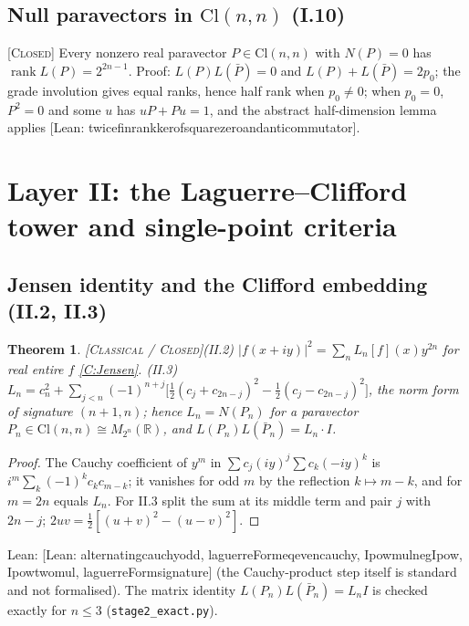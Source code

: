 \documentclass[11pt]{amsart}
\theoremstyle{plain}
\newtheorem{theorem}{Theorem}[section]
\theoremstyle{definition}
\newcommand{\R}{\mathbb{R}}
\newcommand{\Cl}{\mathrm{Cl}}
\newcommand{\status}[1]{\textsc{[#1]}}
\newcommand{\leanus}{\textunderscore\allowbreak}
\newcommand{\lean}[1]{{\ttfamily\let\_\leanus #1}}
\begin{document}
\subsection{Null paravectors in $\Cl(n,n)$ (I.10)}
\status{Closed} Every nonzero real paravector $P\in\Cl(n,n)$ with $N(P)=0$ has
$\operatorname{rank}L(P)=2^{2n-1}$. Proof: $L(P)L(\bar P)=0$ and
$L(P)+L(\bar P)=2p_0$; the grade involution gives equal ranks, hence half rank
when $p_0\ne0$; when $p_0=0$, $P^2=0$ and some $u$ has $uP+Pu=1$, and the
abstract half-dimension lemma applies
\lean{[Lean: twice\_finrank\_ker\_of\_square\_zero\_and\_anticommutator]}.

\section{Layer II: the Laguerre--Clifford tower and single-point criteria}

\subsection{Jensen identity and the Clifford embedding (II.2, II.3)}
\begin{theorem}\status{Classical / Closed}\label{thm:jensen}
(II.2) $|f(x+iy)|^2=\sum_nL_n[f](x)y^{2n}$ for real entire $f$ \ref{C:Jensen}.
(II.3) $L_n=c_n^2+\sum_{j<n}(-1)^{n+j}\big[\tfrac12(c_j+c_{2n-j})^2-\tfrac12(c_j-c_{2n-j})^2\big]$,
the norm form of signature $(n+1,n)$; hence $L_n=N(P_n)$ for a paravector
$P_n\in\Cl(n,n)\cong M_{2^n}(\R)$, and $L(P_n)L(\bar P_n)=L_n\cdot I$.
\end{theorem}
\begin{proof}
The Cauchy coefficient of $y^m$ in $\sum c_j(iy)^j\sum c_k(-iy)^k$ is
$i^m\sum_k(-1)^kc_kc_{m-k}$; it vanishes for odd $m$ by the reflection
$k\mapsto m-k$, and for $m=2n$ equals $L_n$. For II.3 split the sum at its
middle term and pair $j$ with $2n-j$; $2uv=\frac12[(u+v)^2-(u-v)^2]$.
\end{proof}
\noindent Lean: \lean{[Lean: alternating\_cauchy\_odd, laguerreForm\_eq\_even\_cauchy,
I\_pow\_mul\_neg\_I\_pow, I\_pow\_two\_mul, laguerreForm\_signature]} (the Cauchy-product
step itself is standard and not formalised). The matrix identity
$L(P_n)L(\bar P_n)=L_n I$ is checked exactly for $n\le3$ (\texttt{stage2\_exact.py}).
\end{document}
